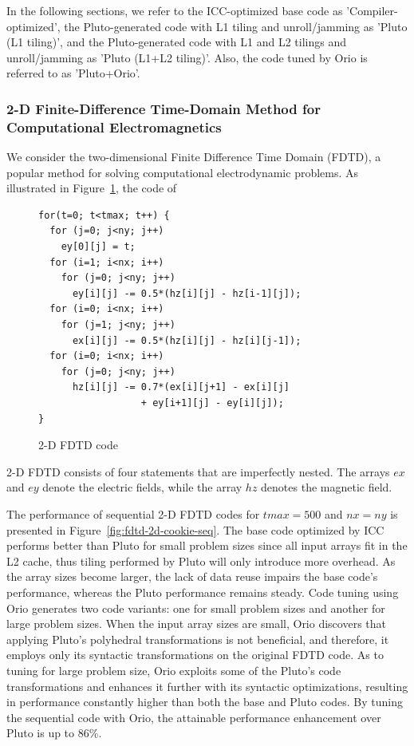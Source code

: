 In the following sections, we refer to the ICC-optimized base code as
'Compiler-optimized', the Pluto-generated code with L1 tiling and
unroll/jamming as 'Pluto (L1 tiling)', and the Pluto-generated code
with L1 and L2 tilings and unroll/jamming as 'Pluto (L1+L2
tiling)'. Also, the code tuned by Orio is referred to as 'Pluto+Orio'.
 
\subsubsection{2-D Finite-Difference Time-Domain Method for Computational Electromagnetics}  
We consider the two-dimensional Finite Difference Time Domain (FDTD),
a popular method for solving computational electrodynamic problems. As
illustrated in Figure~\ref{fig:fdtd-2d-code}, the code of 
%
\begin{figure}
\vspace{-0.2in}
\begin{center}
\begin{minipage}{3in} 
\scriptsize
\begin{verbatim} 
for(t=0; t<tmax; t++) { 
  for (j=0; j<ny; j++) 
    ey[0][j] = t; 
  for (i=1; i<nx; i++) 
    for (j=0; j<ny; j++) 
      ey[i][j] -= 0.5*(hz[i][j] - hz[i-1][j]); 
  for (i=0; i<nx; i++) 
    for (j=1; j<ny; j++) 
      ex[i][j] -= 0.5*(hz[i][j] - hz[i][j-1]); 
  for (i=0; i<nx; i++) 
    for (j=0; j<ny; j++) 
      hz[i][j] -= 0.7*(ex[i][j+1] - ex[i][j]
                  + ey[i+1][j] - ey[i][j]); 
} 
\end{verbatim} 
\end{minipage} 
\end{center}
\vspace{-0.2in}
\caption{2-D FDTD code} 
\label{fig:fdtd-2d-code} 
\end{figure}
%
2-D FDTD consists of four statements that are imperfectly nested. The arrays
$ex$ and $ey$ denote the electric fields, while the array $hz$ denotes
the magnetic field.

The performance of sequential 2-D FDTD codes for $tmax=500$ and
$nx=ny$ is presented in Figure~\ref{fig:fdtd-2d-cookie-seq}. The base
code optimized by ICC performs better than Pluto for small problem
sizes since all input arrays fit in the L2 cache, thus tiling
performed by Pluto will only introduce more overhead. As the array
sizes become larger, the lack of data reuse impairs the base code's
performance, whereas the Pluto performance remains steady. Code tuning
using Orio generates two code variants: one for small problem sizes
and another for large problem sizes. When the input array sizes are
small, Orio discovers that applying Pluto's polyhedral transformations
is not beneficial, and therefore, it employs only its syntactic
transformations on the original FDTD code. As to tuning for large
problem size, Orio exploits some of the Pluto's code transformations
and enhances it further with its syntactic optimizations, resulting in
performance constantly higher than both the base and Pluto codes. By
tuning the sequential code with Orio, the attainable performance
enhancement over Pluto is up to 86\%.
 
